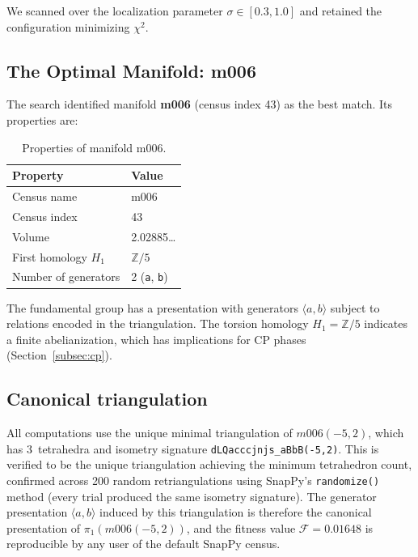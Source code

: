 \documentclass[11pt,a4paper]{article}
\begin{document}
We scanned over the localization parameter $\sigma \in [0.3, 1.0]$
and retained the configuration minimizing $\chi^2$.

\subsection{The Optimal Manifold: m006}
\label{subsec:m006}

The search identified manifold \textbf{m006} (census index 43) as 
the best match. Its properties are:

\begin{table}[h]
\centering
\begin{tabular}{ll}
\toprule
Property & Value \\
\midrule
Census name & m006 \\
Census index & 43 \\
Volume & 2.02885\ldots \\
First homology $H_1$ & $\mathbb{Z}/5$ \\
Number of generators & 2 (\texttt{a}, \texttt{b}) \\
\bottomrule
\end{tabular}
\caption{Properties of manifold m006.}
\label{tab:m006}
\end{table}

The fundamental group has a presentation with generators 
$\langle a, b \rangle$ subject to relations encoded in the triangulation. 
The torsion homology $H_1 = \mathbb{Z}/5$ indicates a finite abelianization, 
which has implications for CP phases (Section~\ref{subsec:cp}).


\subsection{Canonical triangulation}
\label{subsec:canonical_triang}

All computations use the unique minimal triangulation of $m006(-5,2)$,
which has 3~tetrahedra and isometry signature
\texttt{dLQacccjnjs\_aBbB(-5,2)}.
This is verified to be the unique triangulation achieving the minimum
tetrahedron count, confirmed across 200 random retriangulations using
SnapPy's \texttt{randomize()} method (every trial produced the same
isometry signature). The generator presentation $\langle a, b\rangle$
induced by this triangulation is therefore the canonical presentation
of $\pi_1(m006(-5,2))$, and the fitness value $\mathcal{F} = 0.01648$
is reproducible by any user of the default SnapPy census.
\end{document}
